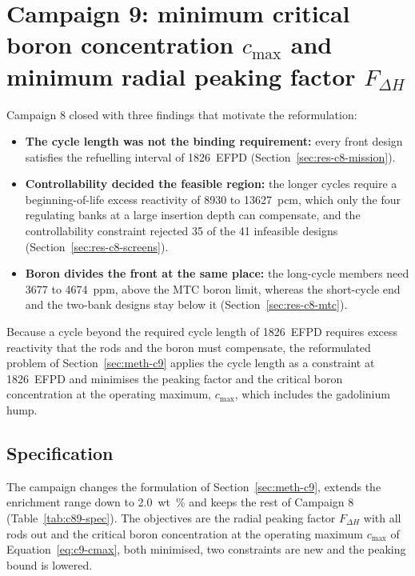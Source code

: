 \section{Campaign 9: minimum critical boron concentration \texorpdfstring{$c_\mathrm{max}$}{c max} and minimum radial peaking factor \texorpdfstring{$F_{\Delta H}$}{F dH}}
\label{sec:res-c9}\label{sec:res-c8-retro}

Campaign 8 closed with three findings that motivate the reformulation:

\begin{itemize}
  \item \textbf{The cycle length was not the binding requirement:}
        every front design satisfies the refuelling interval of
        \SI{1826}{EFPD} (Section~\ref{sec:res-c8-mission}).

  \item \textbf{Controllability decided the feasible region:} the
        longer cycles require a beginning-of-life excess reactivity of
        \num{8930} to \SI{13627}{pcm}, which only the four regulating
        banks at a large insertion depth can compensate, and the
        controllability constraint rejected 35 of the 41 infeasible
        designs (Section~\ref{sec:res-c8-screens}).

  \item \textbf{Boron divides the front at the same place:} the
        long-cycle members need 3677 to \SI{4674}{ppm}, above the MTC
        boron limit, whereas the short-cycle end and the two-bank designs
        stay below it (Section~\ref{sec:res-c8-mtc}).
\end{itemize}

Because a cycle beyond the required cycle length of \SI{1826}{EFPD} requires excess reactivity that the
rods and the boron must compensate, the reformulated problem of
Section~\ref{sec:meth-c9} applies the cycle length as a constraint at
\SI{1826}{EFPD} and minimises the peaking factor and the critical boron
concentration at the operating maximum, $c_\mathrm{max}$, which
includes the gadolinium hump.

\subsection{Specification}
\label{sec:res-c9-formulation}

The campaign changes the formulation of Section~\ref{sec:meth-c9},
extends the enrichment range down to \SI{2.0}{wt\%} and keeps the rest
of Campaign 8 (Table~\ref{tab:c89-spec}). The
objectives are the radial peaking factor
$F_{\Delta H}$ with all rods out and the critical boron concentration
at the operating maximum $c_\mathrm{max}$ of
Equation~\eqref{eq:c9-cmax}, both minimised, two constraints are new
and the peaking bound is lowered.

